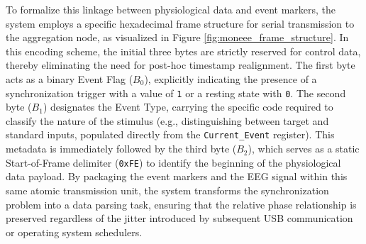 To formalize this linkage between physiological data and event markers, the system employs a specific hexadecimal frame structure for serial transmission to the aggregation node, as visualized in Figure \ref{fig:moneee_frame_structure}. In this encoding scheme, the initial three bytes are strictly reserved for control data, thereby eliminating the need for post-hoc timestamp realignment. The first byte acts as a binary Event Flag ($B_{0}$), explicitly indicating the presence of a synchronization trigger with a value of \texttt{1} or a resting state with \texttt{0}. The second byte ($B_{1}$) designates the Event Type, carrying the specific code required to classify the nature of the stimulus (e.g., distinguishing between target and standard inputs, populated directly from the \texttt{Current\_Event} register). This metadata is immediately followed by the third byte ($B_{2}$), which serves as a static Start-of-Frame delimiter (\texttt{0xFE}) to identify the beginning of the physiological data payload. By packaging the event markers and the EEG signal within this same atomic transmission unit, the system transforms the synchronization problem into a data parsing task, ensuring that the relative phase relationship is preserved regardless of the jitter introduced by subsequent USB communication or operating system schedulers.

